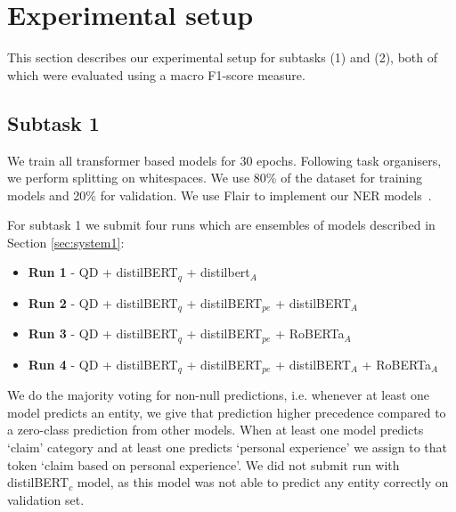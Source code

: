 \documentclass[11pt]{article}
\begin{document}
\section{Experimental setup}
This section describes our experimental setup for subtasks (1) and (2), both of which were evaluated using a macro F1-score measure.
%
%
%
%
%
%
\subsection{Subtask 1}

We train all transformer based models for 30 epochs. 
Following task organisers, we perform splitting on whitespaces.
We use 80\% of the dataset for training models and 20\% for validation.
We use Flair to implement our NER models~\cite{Akbik2019FLAIRAE}.

For subtask 1 we submit four runs which are ensembles of models described in Section \ref{sec:system1}:

\begin{itemize}
\item \textbf{Run 1} - QD + distilBERT$_q$ + distilbert$_A$
\item \textbf{Run 2} - QD + distilBERT$_q$ + distilBERT$_{pe}$ + distilBERT$_A$
\item \textbf{Run 3} - QD + distilBERT$_q$ + distilBERT$_{pe}$ + RoBERTa$_A$
\item \textbf{Run 4} - QD + distilBERT$_q$ + distilBERT$_{pe}$ + distilBERT$_A$ + RoBERTa$_A$ 
\end{itemize}

We do the majority voting for non-null predictions, i.e. whenever at least one model predicts an entity, we give that prediction higher precedence compared to a zero-class prediction from other models.
When at least one model predicts `claim’ category and at least one predicts `personal experience’ we assign to that token `claim based on personal experience’.
We did not submit run with distilBERT$_c$ model, as this model was not able to predict any entity correctly on validation set.
\end{document}
